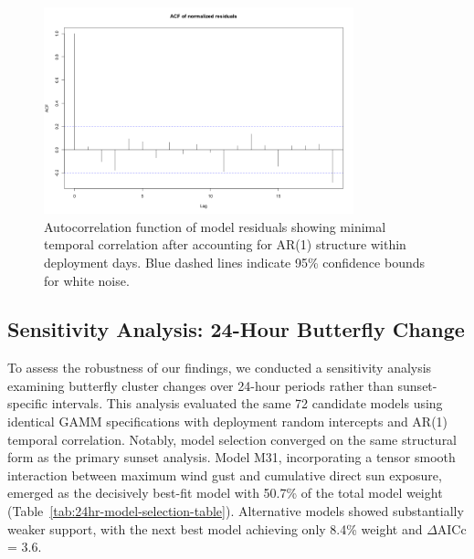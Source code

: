 \begin{figure}[htbp]
    \centering
    \includegraphics[width=0.8\textwidth]{supplemental/results/sunset/figures/diag_acf.png}
    \caption{Autocorrelation function of model residuals showing minimal temporal correlation after accounting for AR(1) structure within deployment days. Blue dashed lines indicate 95\% confidence bounds for white noise.}
    \label{fig:acf_diagnostics_sunset}
\end{figure}

\subsection{Sensitivity Analysis: 24-Hour Butterfly Change}

To assess the robustness of our findings, we conducted a sensitivity analysis examining butterfly cluster changes over 24-hour periods rather than sunset-specific intervals. This analysis evaluated the same 72 candidate models using identical GAMM specifications with deployment random intercepts and AR(1) temporal correlation. Notably, model selection converged on the same structural form as the primary sunset analysis. Model M31, incorporating a tensor smooth interaction between maximum wind gust and cumulative direct sun exposure, emerged as the decisively best-fit model with 50.7\% of the total model weight (Table~\ref{tab:24hr-model-selection-table}). Alternative models showed substantially weaker support, with the next best model achieving only 8.4\% weight and $\Delta$AICc = 3.6.



